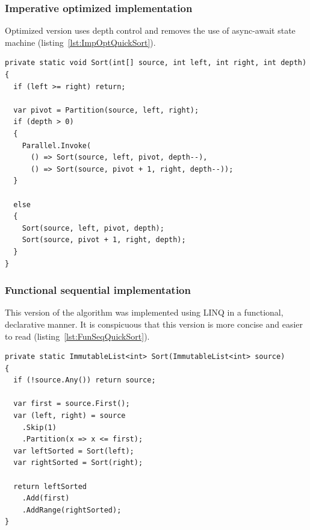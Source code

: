 \subsubsection{Imperative optimized implementation}
Optimized version uses depth control and removes the use of async-await state machine (listing~\ref{lst:ImpOptQuickSort}).
\begin{lstlisting}[language={[sharp]c}, style=sharpcstyle, caption={Imperative optimized quicksort}, label={lst:ImpOptQuickSort},
numbers=none, xleftmargin=0pt,framexleftmargin=0pt,framexrightmargin=0pt,framexbottommargin=0pt]
private static void Sort(int[] source, int left, int right, int depth)
{
  if (left >= right) return;

  var pivot = Partition(source, left, right);
  if (depth > 0)
  {
    Parallel.Invoke(
      () => Sort(source, left, pivot, depth--),
      () => Sort(source, pivot + 1, right, depth--));
  }

  else
  {
    Sort(source, left, pivot, depth);
    Sort(source, pivot + 1, right, depth);
  }
}
\end{lstlisting}

\subsubsection{Functional sequential implementation}
This version of the algorithm was implemented using LINQ in a functional, declarative manner. It is conspicuous that this version is more concise and easier to read (listing~\ref{lst:FunSeqQuickSort}).
\begin{lstlisting}[language={[sharp]c}, style=sharpcstyle, caption={Functional sequential quicksort implementation}, label={lst:FunSeqQuickSort},
numbers=none, xleftmargin=0pt,framexleftmargin=0pt,framexrightmargin=0pt,framexbottommargin=0pt]
private static ImmutableList<int> Sort(ImmutableList<int> source)
{
  if (!source.Any()) return source;

  var first = source.First();
  var (left, right) = source
    .Skip(1)
    .Partition(x => x <= first);
  var leftSorted = Sort(left);
  var rightSorted = Sort(right);

  return leftSorted
    .Add(first)
    .AddRange(rightSorted);
}
\end{lstlisting}

